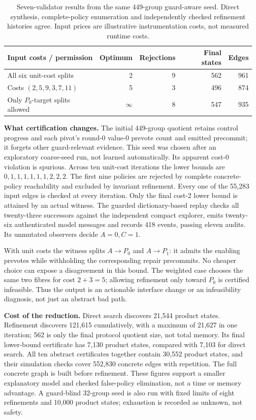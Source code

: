 \begin{table}[t]
\centering\small
\begin{tabular}{lrrrr}
\toprule
Input costs / permission & Optimum & Rejections & Final states & Edges \\
\midrule
All six unit-cost splits & 2 & 9 & 562 & 961 \\
Costs $(2,5,9,3,7,11)$ & 5 & 3 & 496 & 874 \\
Only $P_0$-target splits allowed & $\infty$ & 8 & 547 & 935 \\
\bottomrule
\end{tabular}
\caption{Seven-validator results from the same 449-group guard-aware seed. Direct synthesis, complete-policy enumeration and independently checked refinement histories agree. Input prices are illustrative instrumentation costs, not measured runtime costs.}
\label{tab:scaled}
\end{table}

\textbf{What certification changes.} The initial 449-group quotient
retains control progress and each pivot's round-0 value-0 prevote count
and emitted precommit; it forgets other guard-relevant evidence. This
seed was chosen after an exploratory coarse-seed run, not learned
automatically. Its apparent cost-0 violation is spurious. Across ten
unit-cost iterations the lower bounds are \(0,1,1,1,1,1,1,2,2,2\). The
first nine policies are rejected by complete concrete-policy
reachability and excluded by invariant refinement. Every one of the
55,283 input edges is checked at every iteration. Only the final cost-2
lower bound is attained by an actual witness. The guarded
dictionary-based replay checks all twenty-three successors against the
independent compact explorer, emits twenty-six authenticated model
messages and records 418 events, passing eleven audits. Its unmutated
observers decide \(A=0,C=1\).

With unit costs the witness splits \(A\to P_0\) and \(A\to P_1\): it
admits the enabling prevotes while withholding the corresponding repair
precommits. No cheaper choice can expose a disagreement in this bound.
The weighted case chooses the same two fibres for cost \(2+3=5\);
allowing refinement only toward \(P_0\) is certified infeasible. Thus
the output is an actionable interface change or an infeasibility
diagnosis, not just an abstract bad path.

\textbf{Cost of the reduction.} Direct search discovers 21,544 product
states. Refinement discovers 121,615 cumulatively, with a maximum of
21,627 in one iteration; 562 is only the final protocol quotient size,
not total memory. Its final lower-bound certificate has 7,130 product
states, compared with 7,103 for direct search. All ten abstract
certificates together contain 30,552 product states, and their
simulation checks cover 552,830 concrete edges with repetition. The full
concrete graph is built before refinement. These figures support a
smaller explanatory model and checked false-policy elimination, not a
time or memory advantage. A guard-blind 32-group seed is also run with
fixed limits of eight refinements and 10,000 product states; exhaustion
is recorded as unknown, not safety.

